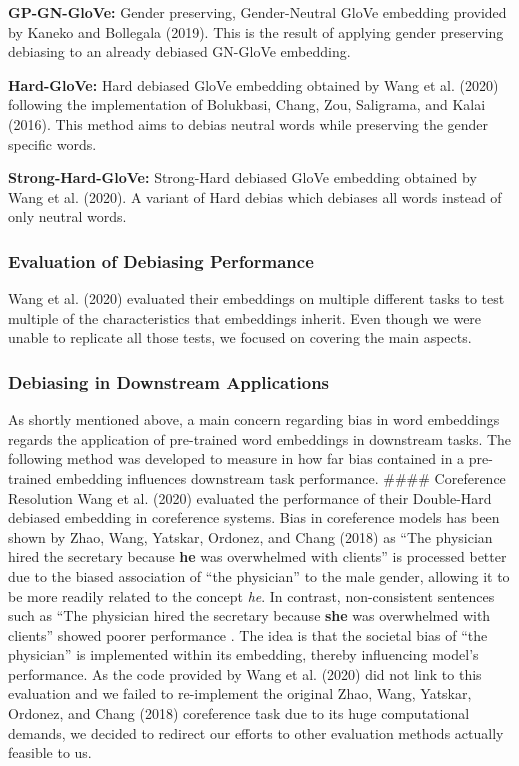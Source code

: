 \documentclass[
  english,
  man,floatsintext]{apa6}
\begin{document}
\textbf{GP-GN-GloVe:} Gender preserving, Gender-Neutral GloVe embedding provided by Kaneko and Bollegala (2019). This is the result of applying gender preserving debiasing to an already debiased GN-GloVe embedding.

\textbf{Hard-GloVe:} Hard debiased GloVe embedding obtained by Wang et al. (2020) following the implementation of Bolukbasi, Chang, Zou, Saligrama, and Kalai (2016). This method aims to debias neutral words while preserving the gender specific words.

\textbf{Strong-Hard-GloVe:} Strong-Hard debiased GloVe embedding obtained by Wang et al. (2020). A variant of Hard debias which debiases all words instead of only neutral words.

\hypertarget{evaluation-of-debiasing-performance}{%
\subsubsection{Evaluation of Debiasing Performance}\label{evaluation-of-debiasing-performance}}

Wang et al. (2020) evaluated their embeddings on multiple different tasks to test multiple of the characteristics that embeddings inherit. Even though we were unable to replicate all those tests, we focused on covering the main aspects.

\hypertarget{debiasing-in-downstream-applications}{%
\subsubsection{Debiasing in Downstream Applications}\label{debiasing-in-downstream-applications}}

As shortly mentioned above, a main concern regarding bias in word embeddings regards the application of pre-trained word embeddings in downstream tasks. The following method was developed to measure in how far bias contained in a pre-trained embedding influences downstream task performance.
\#\#\#\# Coreference Resolution
Wang et al. (2020) evaluated the performance of their Double-Hard debiased embedding in coreference systems. Bias in coreference models has been shown by Zhao, Wang, Yatskar, Ordonez, and Chang (2018) as ``The physician hired the secretary because \textbf{he} was overwhelmed with clients'' is processed better due to the biased association of ``the physician'' to the male gender, allowing it to be more readily related to the concept \emph{he}. In contrast, non-consistent sentences such as ``The physician hired the secretary because \textbf{she} was overwhelmed with clients'' showed poorer performance . The idea is that the societal bias of ``the physician'' is implemented within its embedding, thereby influencing model's performance.
As the code provided by Wang et al. (2020) did not link to this evaluation and we failed to re-implement the original Zhao, Wang, Yatskar, Ordonez, and Chang (2018) coreference task due to its huge computational demands, we decided to redirect our efforts to other evaluation methods actually feasible to us.
\end{document}
